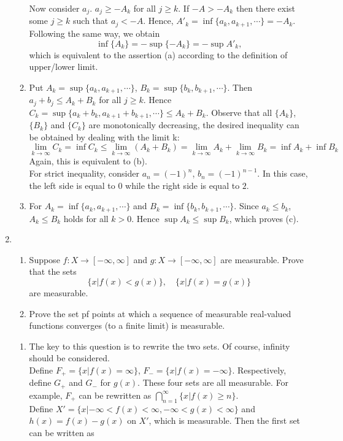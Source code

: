 \documentclass{article}
\begin{document}
\begin{enumerate}
\begin{enumerate}
		Now consider $a_j$. $a_j\geq{-A_k}$ for all $j\geq{k}$. If $-A>-A_k$ then there exist some $j\geq{k}$ such that $a_j<-A$. Hence, $A'_k=\inf\{a_k,a_{k+1},\cdots\}=-A_k$.\\
		Following the same way, we obtain $$\inf\{A_k\}=-\sup\{-A_k\}=-\sup{A'_k},$$ which is equivalent to the assertion (a) according to the definition of upper/lower limit.
		\item Put $A_k=\sup\{a_k,a_{k+1},\cdots\}$, $B_k=\sup\{b_k,b_{k+1},\cdots\}$. Then $a_j+b_j{\leq}A_k+B_k$ for all $j{\geq}k$. Hence $C_k=\sup\{a_k+b_k,a_{k+1}+b_{k+1},\cdots\}\leq{A_k+B_k}$. Observe that all $\{A_k\}$, $\{B_k\}$ and $\{C_k\}$ are monotonically decreasing, the desired inequality can be obtained by dealing with the limit k:
		\[
			\lim\limits_{k\to\infty}C_k=\inf{C_k}\leq\lim\limits_{k\to\infty}(A_k+B_k)=\lim\limits_{k\to\infty}A_k+\lim\limits_{k\to\infty}B_k=\inf{A_k}+\inf{B_k}
		\]
		Again, this is equivalent to (b).\\
		For strict inequality, consider $a_n=(-1)^n$, $b_n=(-1)^{n-1}$. In this case, the left side is equal to $0$ while the right side is equal to $2$.
		\item For $A_k=\inf\{a_k,a_{k+1},\cdots\}$ and $B_k=\inf\{b_k,b_{k+1},\cdots\}$. Since $a_k{\leq}b_k$, $A_k{\leq}B_k$ holds for all $k>0$. Hence $\sup{A_k}\leq\sup{B_k}$, which proves (c).
	\end{enumerate}
	 \item \exercise\begin{enumerate}
	 	\item Suppose $f: X\to[-\infty,\infty]$ and $g:X\to[-\infty,\infty]$ are measurable. Prove that the sets
	 	\[
	 		\{x|f(x)<g(x)\},\quad\{x|f(x)=g(x)\}
	 	\]
	 	are measurable.
	 	\item Prove the set pf points at which a sequence of measurable real-valued functions converges (to a finite limit) is measurable.
	 \end{enumerate}
 	\solution \begin{enumerate}
 		\item The key to this question is to rewrite the two sets. Of course, infinity should be considered.\\
 		Define $F_+=\{x|f(x)=\infty\}$, $F_-=\{x|f(x)=-\infty\}$. Respectively, define $G_+$ and $G_-$ for $g(x)$. These four sets are all measurable. For example, $F_+$ can be rewritten as $\bigcap\limits_{n=1}^{\infty}\{x|f(x)\geq{n}\}$.\\
 		Define $X'=\{x|-\infty<f(x)<\infty,-\infty<g(x)<\infty\}$ and $h(x)=f(x)-g(x)$ on $X'$, which is measurable. Then the first set can be written as

\end{enumerate}
\end{enumerate}
\end{document}
